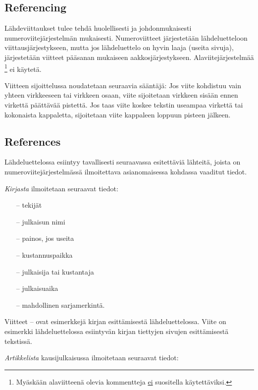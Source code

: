 \documentclass[english,12pt,a4paper,pdftex]{article}
\begin{document}
\subsection*{Referencing}

Lähdeviittaukset tulee tehdä huolellisesti ja johdonmukaisesti
numeroviitejärjestelmän mukaisesti. Numeroviitteet järjestetään
lähdeluetteloon viittausjärjestykseen, mutta jos lähdeluettelo
on hyvin laaja (useita sivuja), järjestetään viitteet pääsanan
mukaiseen aakkosjärjestykseen. Alaviitejärjestelmää
\footnote{Myäskään alaviitteenä olevia kommentteja \underline{ei} suositella
käytettäviksi.} ei käytetä.

Viitteen sijoittelussa noudatetaan seuraavia sääntäjä:
Jos viite kohdistuu vain yhteen virkkeeseen tai virkkeen
osaan, viite \cite{Kauranen} sijoitetaan virkkeen sisään ennen virkettä
päättävää pistettä. Jos taas viite koskee tekstin useampaa
virkettä tai kokonaista kappaletta, sijoitetaan viite kappaleen loppuun
pisteen jälkeen. \cite{Kauranen}

\subsection*{References}

Lähdeluettelossa esiintyy tavallisesti seuraavassa esitettäviä
lähteitä, joista on numeroviitejärjestelmässä ilmoitettava
asianomaisessa kohdassa vaaditut tiedot.

\textit{Kirjasta} ilmoitetaan seuraavat tiedot:

\begin{itemize}
\item[--]tekijät
\item[--]julkaisun nimi
\item[--]painos, jos useita
\item[--]kustannuspaikka
\item[--]julkaisija tai kustantaja
\item[--]julkaisuaika
\item[--]mahdollinen sarjamerkintä.
\end{itemize}

Viitteet \cite{Kauranen}--\cite{Koblitz} ovat esimerkkejä kirjan
esittämisestä lähdeluettelossa. Viite \cite[s.\ 83--124]{Koblitz} on
esimerkki lähdeluettelossa esiintyvän kirjan tiettyjen sivujen
esittämisestä tekstissä.

\textit{Artikkelista} kausijulkaisussa ilmoitetaan seuraavat tiedot:
\end{document}
